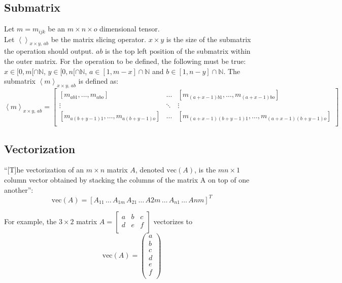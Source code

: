 \documentclass[12pt]{article}
\begin{document}
\subsection{Submatrix}
\label{sec:Ref:submatrix}
Let \(m = m_{ijk}\) be an \(m\times n\times o\) dimensional tensor.\\
Let \(\left<\right>_{x\times y,\,ab}\) be the matrix slicing operator. \(x\times y\) is the size of the submatrix the operation should output. \(ab\) is the top left position of the submatrix within the outer matrix.  For the operation to be defined, the following must be true: \(x \in [0, m[\cap\mathbb N\), \(y \in [0, n[ \cap\mathbb N\), \(a  \in [1, m-x]\cap\mathbb N\) and \(b \in [1, n-y]\cap\mathbb N\). The submatrix \(\left<m\right>_{x\times y,\,ab}\) is defined as:
\begin{equation}
\left<m\right>_{x\times y,\,ab} = 
\left[
\begin{matrix}
[m_{ab1},\dots,m_{abo}] & \dots & [m_{(a+x-1)b1},\dots,m_{(a+x-1)bo}]\\
\vdots &  \ddots & \vdots\\
[m_{a(b+y-1)1},\dots,m_{a(b+y-1)o}] & \dots & [m_{(a+x-1)(b+y-1)1},\dots,m_{(a+x-1)(b+y-1)o}]\\
\end{matrix}\right]
\end{equation}

\subsection{Vectorization}  \label{sec:ref:vectorization}
``[T]he vectorization of an \(m \times n\) matrix \(A\), denoted \(\text{vec}(A)\), is the \(mn \times 1\) column vector obtained by stacking the columns of the matrix A on top of one another''\cite{vectorization_2021}: 
\begin{equation}\label{eq:ref:vectorization}
\text{vec}(A) = \left[
A_{11}\,\dots\,A_{1m}\,A_{21}\,\dots \,A{2m}\,\dots\,A_{n1}\,\dots\,A{nm}
\right]^T
\end{equation}

For example, the \(3\times 2\) matrix \(A=\left[
\begin{matrix}
a & b & c\\
d & e & f\\
\end{matrix}
\right]\) vectorizes to
\[
\text{vec}(A) = \left(
\begin{matrix}
a\\
b\\
c\\
d\\
e\\
f\\
\end{matrix}
\right)
\]
\end{document}
